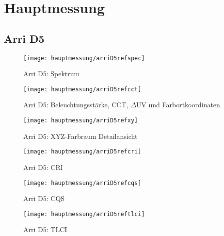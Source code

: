 \documentclass[pagesize,paper=A4,fontsize=12pt,utf8,numbers=noenddot,bibliography=totoc,listof=totoc,DIV=11,BCOR=1mm]{scrreprt}
\begin{document}
\section{Hauptmessung}

\subsection{Arri D5}

\begin{figure}[htp]     %
\centering
\texttt{[image: hauptmessung/arriD5refspec]} 
\caption {Arri D5: Spektrum} 
\end{figure}

\begin{figure}[htp]     %
\centering
\texttt{[image: hauptmessung/arriD5refcct]} 
\caption {Arri D5: Beleuchtungsstärke, CCT, $\Delta$UV und Farbortkoordinaten} 
\end{figure}

\begin{figure}[htp]     %
\centering
\texttt{[image: hauptmessung/arriD5refxy]} 
\caption {Arri D5: XYZ-Farbraum Detailansicht} 
\end{figure}

\begin{figure}[htp]     %
\centering
\texttt{[image: hauptmessung/arriD5refcri]} 
\caption {Arri D5: CRI} 
\end{figure}

\begin{figure}[htp]     %
\centering
\texttt{[image: hauptmessung/arriD5refcqs]} 
\caption {Arri D5: CQS} 
\end{figure}

\begin{figure}[htp]     %
\centering
\texttt{[image: hauptmessung/arriD5reftlci]} 
\caption {Arri D5: TLCI} 
\end{figure}
\end{document}
